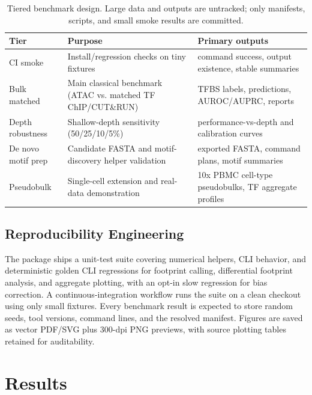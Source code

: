 \documentclass[biomedinformatics,article,submit,pdftex,moreauthors]{Definitions/mdpi}
\begin{document}
\begin{table}[H]
\caption{Tiered benchmark design. Large data and outputs are untracked; only
manifests, scripts, and small smoke results are committed.\label{tab:tiers}}
\begin{tabularx}{\textwidth}{lYY}
\toprule
\textbf{Tier} & \textbf{Purpose} & \textbf{Primary outputs}\\
\midrule
CI smoke & Install/regression checks on tiny fixtures & command success, output existence, stable summaries\\
Bulk matched & Main classical benchmark (ATAC vs. matched TF ChIP/CUT\&RUN) & TFBS labels, predictions, AUROC/AUPRC, reports\\
Depth robustness & Shallow-depth sensitivity (50/25/10/5\%) & performance-vs-depth and calibration curves\\
De novo motif prep & Candidate FASTA and motif-discovery helper validation & exported FASTA, command plans, motif summaries\\
Pseudobulk & Single-cell extension and real-data demonstration & 10x PBMC cell-type pseudobulks, TF aggregate profiles\\
\bottomrule
\end{tabularx}
\end{table}

\subsection{Reproducibility Engineering}

The package ships a unit-test suite covering numerical helpers, CLI behavior, and
deterministic golden CLI regressions for footprint calling, differential footprint analysis,
and aggregate plotting, with an opt-in slow regression for bias correction. A
continuous-integration workflow runs the suite on a clean checkout using only
small fixtures. Every benchmark result is expected to store random seeds, tool
versions, command lines, and the resolved manifest. Figures are saved as vector
PDF/SVG plus 300-dpi PNG previews, with source plotting tables retained for
auditability.

\section{Results}
\end{document}
